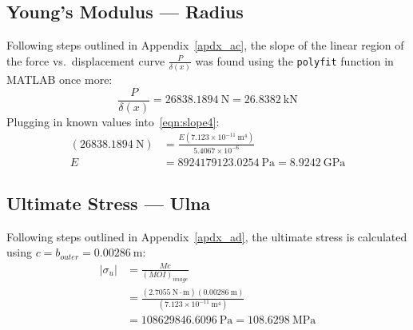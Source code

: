\documentclass[conference, letterpaper]{IEEEtran}
\begin{document}
        \subsection{Young's Modulus --- Radius}\label{apdx_bc}
            Following steps outlined in Appendix~\ref{apdx_ac}, the slope of the linear region of the force vs.\ displacement curve \(\frac{P}{\delta (x)}\) was found using the \texttt{polyfit} function in MATLAB once more:\@
            \[
                \frac{P}{\delta (x)} 
                = 26838.1894\ \text{N}
                = 26.8382\ \text{kN}
            \]
            Plugging in known values into~\eqref{eqn:slope4}:
            \begin{align*}
                (26838.1894\ \text{N})
                &= \frac{E(7.123\times10^{-11}\ \text{m}^4)}{5.4067\times10^{-6}} \\
                E 
                &= 8924179123.0254\ \text{Pa}
                = 8.9242\ \text{GPa}
            \end{align*}

        \subsection{Ultimate Stress --- Ulna}\label{apdx_bd}
            Following steps outlined in Appendix~\ref{apdx_ad}, the ultimate stress is calculated using \(c = b_{outer} = 0.00286\ \text{m}\):\@
            \begin{align*}
                \vert \sigma _u \vert 
                &= \frac{Mc}{{(MOI)}_{image}} \\
                &= \frac{(2.7055\ \text{N}\cdot\text{m})(0.00286\ \text{m})}{(7.123\times10^{-11}\ \text{m}^4)} \\
                &= 108629846.6096\ \text{Pa}
                = 108.6298\ \text{MPa}
            \end{align*}
\end{document}
